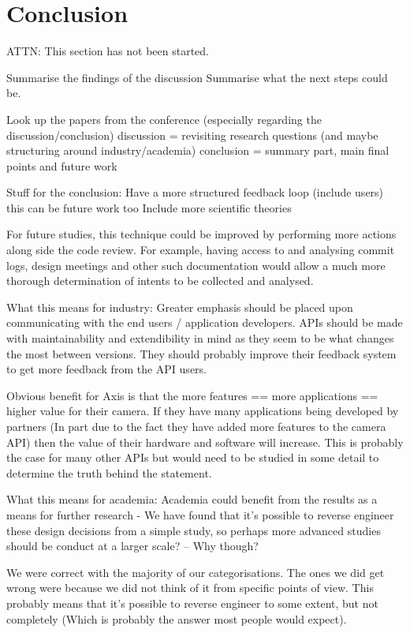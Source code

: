 \documentclass{sig-alternate}
\begin{document}
\section{Conclusion} \label{conclusion}
ATTN: This section has not been started. 

Summarise the findings of the discussion
Summarise what the next steps could be.

Look up the papers from the conference (especially regarding the discussion/conclusion)
discussion = revisiting research questions (and maybe structuring around industry/academia)
conclusion = summary part, main final points and future work 

Stuff for the conclusion:
Have a more structured feedback loop (include users) this can be future work too
Include more scientific theories



For future studies, this technique could be improved by performing more actions along side the code review. For example, having access to and analysing commit logs, design meetings and other such documentation would allow a much more thorough determination of intents to be collected and analysed. %


       What this means for industry:
              Greater emphasis should be placed upon communicating with the end users / application developers. APIs should be made with maintainability and extendibility in mind as they seem to be what changes the most between versions. They should probably improve their feedback system to get more feedback from the API users.

              Obvious benefit for Axis is that the more features == more applications == higher value for their camera. If they have many applications being developed by partners (In part due to the fact they have added more features to the camera API) then the value of their hardware and software will increase. This is probably the case for many other APIs but would need to be studied in some detail to determine the truth behind the statement.

       What this means for academia:
              Academia could benefit from the results as a means for further research - We have found that it's possible to reverse engineer these design decisions from a simple study, so perhaps more advanced studies should be conduct at a larger scale? -- Why though?


We were correct with the majority of our categorisations. The ones we did get wrong were because we did not think of it from specific points of view. This probably means that it's possible to reverse engineer to some extent, but not completely (Which is probably the answer most people would expect).
\end{document}
